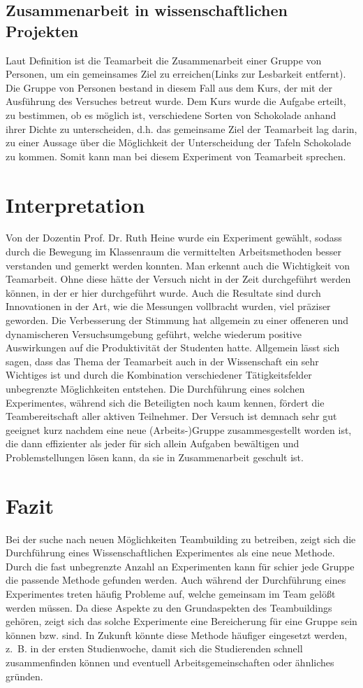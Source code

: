 \documentclass[12pt]{scrartcl}
\begin{document}
\subsection{Zusammenarbeit in wissenschaftlichen Projekten}
Laut Definition ist die Teamarbeit \glqq die Zusammenarbeit einer Gruppe von Personen, um ein gemeinsames Ziel zu erreichen\grqq \cite{Ergebnisse1}(Links zur Lesbarkeit entfernt). Die Gruppe von Personen bestand in diesem Fall aus dem Kurs, der mit der Ausführung des Versuches betreut wurde. Dem Kurs wurde die Aufgabe erteilt, zu bestimmen, ob es möglich ist, verschiedene Sorten von Schokolade anhand ihrer Dichte zu unterscheiden, d.h. das gemeinsame Ziel der Teamarbeit lag darin, zu einer Aussage über die Möglichkeit der Unterscheidung der Tafeln Schokolade zu kommen. Somit kann man bei diesem Experiment von Teamarbeit sprechen.
\section{Interpretation}
Von der Dozentin Prof. Dr. Ruth Heine wurde ein Experiment gewählt, sodass durch die Bewegung im Klassenraum die vermittelten Arbeitsmethoden besser verstanden und gemerkt werden konnten\cite {Interpretation1}. Man erkennt auch die Wichtigkeit von Teamarbeit. Ohne diese hätte der Versuch nicht in der Zeit durchgeführt werden können, in der er hier durchgeführt wurde. Auch die Resultate sind durch Innovationen in der Art, wie die Messungen vollbracht wurden, viel präziser geworden. Die Verbesserung der Stimmung hat allgemein zu einer offeneren und dynamischeren Versuchsumgebung geführt, welche wiederum positive Auswirkungen auf die Produktivität der Studenten hatte. Allgemein lässt sich sagen, dass das Thema der Teamarbeit auch in der Wissenschaft ein sehr Wichtiges ist und durch die Kombination verschiedener Tätigkeitsfelder unbegrenzte Möglichkeiten entstehen. Die Durchführung eines solchen Experimentes, während sich die Beteiligten noch kaum kennen, fördert die Teambereitschaft aller aktiven Teilnehmer. Der Versuch ist demnach sehr gut geeignet kurz nachdem eine neue (Arbeits-)Gruppe zusammesgestellt worden ist, die dann effizienter als jeder für sich allein Aufgaben bewältigen und Problemstellungen lösen kann, da sie in Zusammenarbeit geschult ist.
\section{Fazit}
Bei der suche nach neuen Möglichkeiten Teambuilding zu betreiben, zeigt sich die Durchführung eines Wissenschaftlichen Experimentes als eine neue Methode. Durch die fast unbegrenzte Anzahl an Experimenten kann für schier jede Gruppe die passende Methode gefunden werden. Auch während der Durchführung eines Experimentes treten häufig Probleme auf, welche gemeinsam im Team gelößt werden müssen. Da diese Aspekte zu den Grundaspekten des Teambuildings gehören, zeigt sich das solche Experimente eine Bereicherung für eine Gruppe sein können bzw. sind. In Zukunft könnte diese Methode häufiger eingesetzt werden, z.~B. in der ersten Studienwoche, damit sich die Studierenden schnell zusammenfinden können und eventuell Arbeitsgemeinschaften oder ähnliches gründen.
\end{document}
